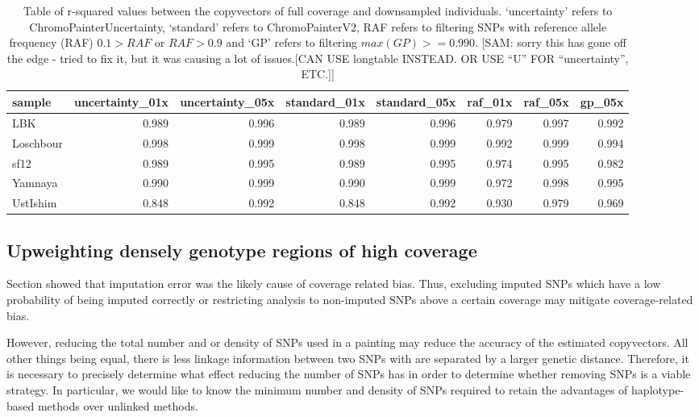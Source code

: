 \begin{table}
\centering
\begin{tabular}[t]{lrrrrrrr}
\toprule
sample & uncertainty\_01x & uncertainty\_05x & standard\_01x & standard\_05x & raf\_01x & raf\_05x & gp\_05x\\
\midrule
LBK & 0.989 & 0.996 & 0.989 & 0.996 & 0.979 & 0.997 & 0.992\\
Loschbour & 0.998 & 0.999 & 0.998 & 0.999 & 0.992 & 0.999 & 0.994\\
sf12 & 0.989 & 0.995 & 0.989 & 0.995 & 0.974 & 0.995 & 0.982\\
Yamnaya & 0.990 & 0.999 & 0.990 & 0.999 & 0.972 & 0.998 & 0.995\\
UstIshim & 0.848 & 0.992 & 0.848 & 0.992 & 0.930 & 0.979 & 0.969\\
\bottomrule
\end{tabular}
\caption{Table of r-squared values between the copyvectors of full coverage and downsampled individuals. `uncertainty' refers to ChromoPainterUncertainty, `standard' refers to ChromoPainterV2, RAF refers to filtering SNPs with reference allele frequency (RAF) $0.1 > RAF$ or $RAF > 0.9$ and `GP' refers to filtering $max(GP) >= 0.990$. [SAM: sorry this has gone off the edge - tried to fix it, but it was causing a lot of issues.{\color{red}[CAN USE longtable INSTEAD. OR USE ``U'' FOR ``uncertainty'', ETC.]}]}
\end{table}



\subsection{Upweighting densely genotype regions of high coverage}

Section  showed that imputation error was the likely cause of coverage related bias. Thus, excluding imputed SNPs which have a low probability of being imputed correctly or restricting analysis to non-imputed SNPs above a certain coverage may mitigate coverage-related bias.

However, reducing the total number and or density of SNPs used in a painting may reduce the accuracy of the estimated copyvectors. All other things being equal, there is less linkage information between two SNPs with are separated by a larger genetic distance. Therefore, it is necessary to precisely determine what effect reducing the number of SNPs has in order to determine whether removing SNPs is a viable strategy. In particular, we would like to know the minimum number and density of SNPs required to retain the advantages of haplotype-based methods over unlinked methods. 

